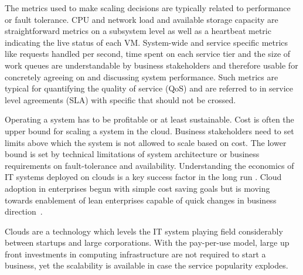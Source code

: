 \documentclass[english]{tktltiki2}
\theoremstyle{definition}
\theoremstyle{remark}
\begin{document}
The metrics used to make scaling decisions are typically related to performance
or fault tolerance. CPU and network load and available storage capacity are
straightforward metrics on a subsystem level as well as a heartbeat metric
indicating the live status of each VM. System-wide and service specific metrics
like requests handled per second, time spent on each service tier and the size
of work queues are understandable by business stakeholders and therefore usable
for concretely agreeing on and discussing system performance. Such metrics are
typical for quantifying the quality of service (QoS) and are referred to in
service level agreements (SLA) \cite{Boloor2011} with specific that should not be crossed.


Operating a system has to be profitable or at least sustainable. Cost is often
the upper bound for scaling a system in the cloud. Business stakeholders need to
set limits above which the system is not allowed to scale based on cost. The
lower bound is set by technical limitations of system architecture or business
requirements on fault-tolerance and availability. Understanding the economics of
IT systems deployed on clouds is a key success factor in the long run
\cite{Suleiman2011}. Cloud adoption in enterprises begun with simple cost saving
goals but is moving towards enablement of lean enterprises capable of quick
changes in business direction~\cite{Marston2011}.

Clouds are a technology which levels the IT system playing field considerably
between startups and large corporations. With the pay-per-use model, large up
front investments in computing infrastructure are not required to start a
business, yet the scalability is available in case the service popularity
explodes.


\end{document}
